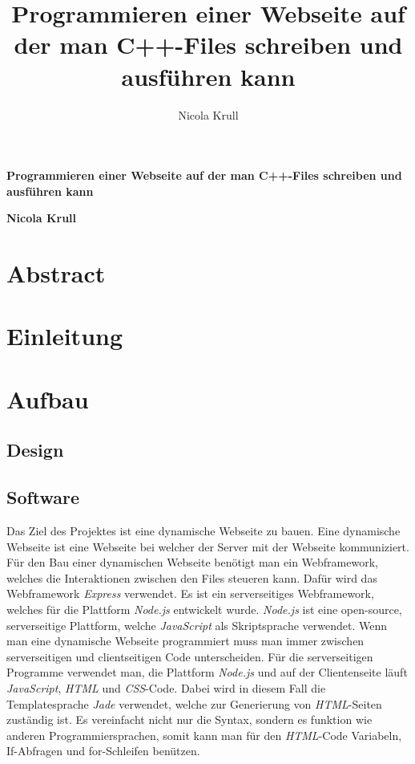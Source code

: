 \documentclass[10pt]{article}
\title{Programmieren einer Webseite auf der man C++-Files schreiben und ausführen kann}
\author{Nicola Krull}
\begin{document}
	
	\begin{titlepage}
	\begin{center}
	\huge
	\textbf{Programmieren einer Webseite auf der man C++-Files schreiben und ausführen kann}
	
	\vspace{1cm}	
	
	\LARGE
	\textbf{Nicola Krull}
	\end{center}
\end{titlepage}
	
	\tableofcontents
	\newpage
	\section{Abstract}
	\section{Einleitung}
	\pagebreak
	\section{Aufbau}
	\subsection{Design}
	
	\subsection{Software}
	Das Ziel des Projektes ist eine dynamische Webseite zu bauen. Eine dynamische Webseite ist eine Webseite bei welcher der Server mit der Webseite kommuniziert.\cite{1} %
	Für den Bau einer dynamischen Webseite benötigt man ein Webframework, welches die Interaktionen zwischen den 			Files steueren kann. Dafür wird das Webframework \textit{Express} verwendet. Es ist ein serverseitiges Webframework, welches für die Plattform \textit{Node.js} entwickelt wurde.\cite{2} \textit{Node.js} ist eine open-source, serverseitige Plattform, welche \textit{JavaScript} als Skriptsprache verwendet.\cite{3}	Wenn man eine dynamische Webseite programmiert muss man immer zwischen serverseitigen und clientseitigen Code unterscheiden. Für die serverseitigen Programme verwendet man, die Plattform \textit{Node.js} und auf der Clientenseite läuft \textit{JavaScript}, \textit{HTML} und \textit{CSS}-Code. Dabei wird in diesem Fall die Templatesprache \textit{Jade} verwendet, welche zur Generierung von \textit{HTML}-Seiten zuständig ist. Es vereinfacht nicht nur die Syntax, sondern es funktion wie anderen Programmiersprachen, somit kann man für den \textit{HTML}-Code Variabeln, If-Abfragen und for-Schleifen benützen. \cite{4}
\end{document}
